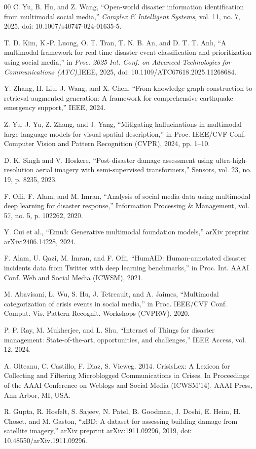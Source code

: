 \documentclass[conference]{IEEEtran}
\begin{document}
\begin{thebibliography}{00}
 C. Yu, B. Hu, and Z. Wang, “Open-world disaster information identification from multimodal social media,” \textit{Complex \& Intelligent Systems}, vol. 11, no. 7, 2025, doi: 10.1007/s40747-024-01635-5.

 T. D. Kim, K.-P. Luong, O. T. Tran, T. N. B. An, and D. T. T. Anh, “A multimodal framework for real-time disaster event classification and prioritization using social media,” in \textit{Proc. 2025 Int. Conf. on Advanced Technologies for Communications (ATC)},IEEE, 2025, doi: 10.1109/ATC67618.2025.11268684.

 Y. Zhang, H. Liu, J. Wang, and X. Chen, “From knowledge graph construction to retrieval-augmented generation: A framework for comprehensive earthquake emergency support,” IEEE, 2024.

 Z. Yu, J. Yu, Z. Zhang, and J. Yang, “Mitigating hallucinations in multimodal large language models for visual spatial description,” in Proc. IEEE/CVF Conf. Computer Vision and Pattern Recognition (CVPR), 2024, pp. 1–10.

 D. K. Singh and V. Hoskere, “Post-disaster damage assessment using ultra-high-resolution aerial imagery with semi-supervised transformers,” Sensors, vol. 23, no. 19, p. 8235, 2023.

 F. Ofli, F. Alam, and M. Imran, “Analysis of social media data using multimodal deep learning for disaster response,” Information Processing \& Management, vol. 57, no. 5, p. 102262, 2020.

 Y. Cui et al., “Emu3: Generative multimodal foundation models,” arXiv preprint arXiv:2406.14228, 2024.

 F. Alam, U. Qazi, M. Imran, and F. Ofli, “HumAID: Human-annotated disaster incidents data from Twitter with deep learning benchmarks,” in Proc. Int. AAAI Conf. Web and Social Media (ICWSM), 2021.

 M. Abavisani, L. Wu, S. Hu, J. Tetreault, and A. Jaimes, “Multimodal categorization of crisis events in social media,” in Proc. IEEE/CVF Conf. Comput. Vis. Pattern Recognit. Workshops (CVPRW), 2020.

 P. P. Ray, M. Mukherjee, and L. Shu, “Internet of Things for disaster management: State-of-the-art, opportunities, and challenges,” IEEE Access, vol. 12, 2024.

 A. Olteanu, C. Castillo, F. Diaz, S. Vieweg. 2014. CrisisLex: A Lexicon for Collecting and Filtering Microblogged Communications in Crises. In Proceedings of the AAAI Conference on Weblogs and Social Media (ICWSM'14). AAAI Press, Ann Arbor, MI, USA.

 R. Gupta, R. Hosfelt, S. Sajeev, N. Patel, B. Goodman, J. Doshi, E. Heim, H. Choset, and M. Gaston, “xBD: A dataset for assessing building damage from satellite imagery,” arXiv preprint arXiv:1911.09296, 2019, doi: 10.48550/arXiv.1911.09296.




\end{thebibliography}
\end{document}
